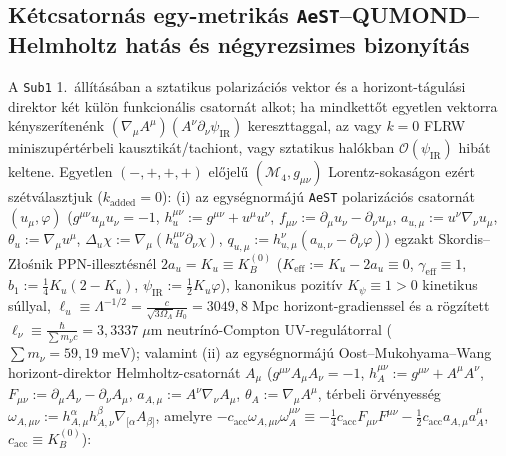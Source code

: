 \documentclass[11pt,a4paper]{article}
\begin{document}
\subsection{Kétcsatornás egy-metrikás \texttt{AeST}--QUMOND--Helmholtz hatás és négyrezsimes bizonyítás}
A {\upshape\texttt{Sub1}} 1.~állításában \cite{Olcsak2026Sub1} a sztatikus polarizációs vektor és a horizont-tágulási direktor két külön funkcionális csatornát alkot; ha mindkettőt egyetlen vektorra kényszerítenénk $(\nabla_\mu A^\mu)(A^\nu\partial_\nu\psi_{\mathrm{IR}})$ kereszttaggal, az vagy $k = 0$ FLRW miniszupértérbeli kausztikát/tachiont, vagy sztatikus halókban $\mathcal{O}(\psi_{\mathrm{IR}})$ hibát keltene. Egyetlen $(-,+,+,+)$ előjelű $(\mathcal{M}_4, g_{\mu\nu})$ Lorentz-sokaságon ezért szétválasztjuk ($k_{\mathrm{added}} = 0$): (i) az egységnormájú \texttt{AeST} polarizációs csatornát $(u_\mu, \varphi)$ \cite{SkordisZlosnik2021} ($g^{\mu\nu}u_\mu u_\nu = -1$, $h_u^{\mu\nu} := g^{\mu\nu} + u^\mu u^\nu$, $f_{\mu\nu} := \partial_\mu u_\nu - \partial_\nu u_\mu$, $a_{u,\mu} := u^\nu\nabla_\nu u_\mu$, $\theta_u := \nabla_\mu u^\mu$, $\Delta_u\chi := \nabla_\mu(h_u^{\mu\nu}\partial_\nu\chi)$, $q_{u,\mu} := h_{u,\mu}^\nu(a_{u,\nu} - \partial_\nu\varphi)$) egzakt Skordis--Z\l{}o\'snik PPN-illesztésnél $2a_u = K_u \equiv K_B^{(0)}$ ($K_{\mathrm{eff}} := K_u - 2a_u \equiv 0$, $\gamma_{\mathrm{eff}} \equiv 1$, $b_1 := \frac{1}{4}K_u(2 - K_u)$, $\psi_{\mathrm{IR}} := \frac{1}{2}K_u\varphi$), kanonikus pozitív $K_\psi \equiv 1 > 0$ kinetikus súllyal, $\ell_u \equiv \Lambda^{-1/2} = \frac{c}{\sqrt{3\Omega_\Lambda}H_0} = 3049{,}8\;\mathrm{Mpc}$ horizont-gradienssel és a rögzített $\ell_\nu \equiv \frac{\hbar}{\sum m_\nu c} = 3{,}3337\;\mu\mathrm{m}$ neutrínó-Compton UV-regulátorral ($\sum m_\nu = 59{,}19\;\mathrm{meV}$); valamint (ii) az egységnormájú Oost--Mukohyama--Wang \cite{OostMukohyamaWang2018} horizont-direktor Helmholtz-csatornát $A_\mu$ ($g^{\mu\nu}A_\mu A_\nu = -1$, $h_A^{\mu\nu} := g^{\mu\nu} + A^\mu A^\nu$, $F_{\mu\nu} := \partial_\mu A_\nu - \partial_\nu A_\mu$, $a_{A,\mu} := A^\nu\nabla_\nu A_\mu$, $\theta_A := \nabla_\mu A^\mu$, térbeli örvényesség $\omega_{A,\mu\nu} := h_{A,\mu}^\alpha h_{A,\nu}^\beta\nabla_{[\alpha}A_{\beta]}$, amelyre $-c_{\mathrm{acc}}\omega_{A,\mu\nu}\omega_A^{\mu\nu} \equiv -\frac{1}{4}c_{\mathrm{acc}}F_{\mu\nu}F^{\mu\nu} - \frac{1}{2}c_{\mathrm{acc}}a_{A,\mu}a_A^\mu$, $c_{\mathrm{acc}} \equiv K_B^{(0)}$):
\end{document}
